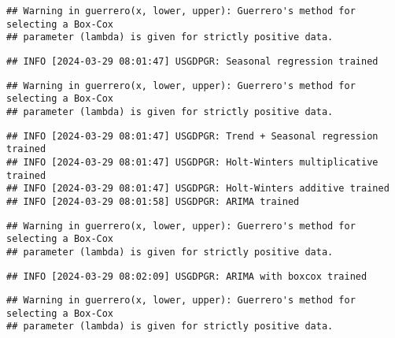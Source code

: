 \documentclass[
]{article}
\begin{document}
\begin{verbatim}
## Warning in guerrero(x, lower, upper): Guerrero's method for selecting a Box-Cox
## parameter (lambda) is given for strictly positive data.
\end{verbatim}

\begin{verbatim}
## INFO [2024-03-29 08:01:47] USGDPGR: Seasonal regression trained
\end{verbatim}

\begin{verbatim}
## Warning in guerrero(x, lower, upper): Guerrero's method for selecting a Box-Cox
## parameter (lambda) is given for strictly positive data.
\end{verbatim}

\begin{verbatim}
## INFO [2024-03-29 08:01:47] USGDPGR: Trend + Seasonal regression trained
## INFO [2024-03-29 08:01:47] USGDPGR: Holt-Winters multiplicative trained
## INFO [2024-03-29 08:01:47] USGDPGR: Holt-Winters additive trained
## INFO [2024-03-29 08:01:58] USGDPGR: ARIMA trained
\end{verbatim}

\begin{verbatim}
## Warning in guerrero(x, lower, upper): Guerrero's method for selecting a Box-Cox
## parameter (lambda) is given for strictly positive data.
\end{verbatim}

\begin{verbatim}
## INFO [2024-03-29 08:02:09] USGDPGR: ARIMA with boxcox trained
\end{verbatim}

\begin{verbatim}
## Warning in guerrero(x, lower, upper): Guerrero's method for selecting a Box-Cox
## parameter (lambda) is given for strictly positive data.
\end{verbatim}
\end{document}
